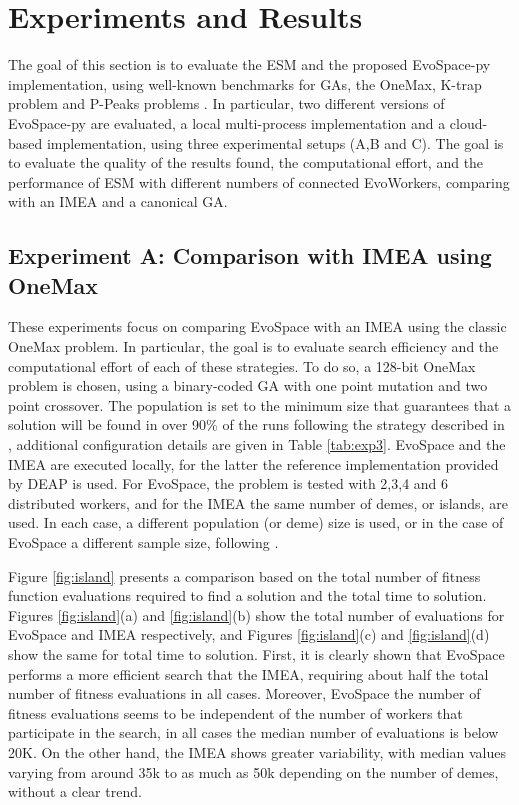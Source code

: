 \section{Experiments and Results}
\label{sec:exp1}
The goal of this section is to evaluate the ESM and the proposed EvoSpace-py implementation, using well-known benchmarks for GAs,
the OneMax, K-trap problem \cite{trap} and P-Peaks problems \cite{Jong:PS97}.
In particular, two different versions of EvoSpace-py are evaluated, a local multi-process implementation and a cloud-based implementation,
using three experimental setups (A,B and C).
The goal is to evaluate the quality of the results found, the computational effort, and the performance of ESM with different numbers
of connected EvoWorkers, comparing with an IMEA and a canonical GA.


\subsection{Experiment A: Comparison with IMEA using OneMax}
These experiments focus on comparing EvoSpace with an IMEA using the classic OneMax problem.
In particular, the goal is to evaluate search efficiency and the computational effort of each of these strategies.
To do so, a 128-bit OneMax problem is chosen, using a binary-coded GA with one point mutation and two point crossover.
The population is set to the minimum size that guarantees that
a solution will be found in over 90\% of the runs following the strategy described in \cite{nodeo},
additional configuration details are given in Table \ref{tab:exp3}.
EvoSpace and the IMEA are executed locally, for the latter the reference implementation provided by DEAP is used.
For EvoSpace, the problem is tested with 2,3,4 and 6 distributed workers,
and for the IMEA the same number of demes, or islands, are used. In each case, a different population (or deme) size is used, or in 
the case of EvoSpace a different sample size, following \cite{nodeo}.

Figure \ref{fig:island} presents a comparison based on the total number of fitness function evaluations required to find a solution
and the total time to solution.
Figures \ref{fig:island}(a) and \ref{fig:island}(b) show the total number of evaluations for EvoSpace and IMEA respectively,
and Figures \ref{fig:island}(c) and \ref{fig:island}(d)  show the same for total time to solution.
First, it is clearly shown that EvoSpace performs a more efficient search that the IMEA, requiring about half the total number of fitness evaluations 
in all cases. Moreover, EvoSpace the number of fitness evaluations seems to be independent of the number of workers that participate in the search, in all cases the median number of evaluations is below 20K.
On the other hand, the IMEA shows greater variability, with median values varying from around 35k to as much as 50k depending on the number of
demes, without a clear trend.

